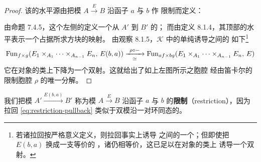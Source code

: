 \begin{proof}
该\trCartesian\trCell{}的水平源由把模 $A\xrightarrow{E}B$ 沿函子 $a$ 与 $b$ 作%
限制而定义：
\begin{rveq}\label{eq:restriction-pullback}
\end{rveq}
由命题 7.4.5，这个左侧的\trIsofibration{}定义一个从 $A'$ 到 $B'$ 的\trModule{}；%
而由定义 8.1.4，其顶部的水平\trFunctor{}表示一个占据所求方块的\trModule{}映射。%
由观察 8.1.5，$\mathcal{K}$ 中的单纯\trPullback{}诱导\trFunctorSpace{}之间的%
如下\trEquivalence\footnote{若诸拉回按严格意义定义，则拉回事实上诱导%
\trFunctorSpace{}之间的一个\trIsomorphism；但即使把 $E(b,a)$ 换成一支等价的%
\trModule，诸\trFunctorSpace{}仍相等价，这已足以在对象的\trIsomorphism{}类上%
诱导一个双射。}
\begin{equation*}
\operatorname{Fun}_{f\times g}(E_{1}\times_{A_{1}}\cdots\times_{A_{n-1}}E_{n},\,E(b,a))
\xrightarrow[\ \simeq\ ]{\ \rho\circ-\ }
\operatorname{Fun}_{af\times bg}(E_{1}\times_{A_{1}}\cdots\times_{A_{n-1}}E_{n},\,E)
\end{equation*}
它在对象的\trIsomorphism{}类上下降为一个双射。这就给出了如上左图所示之胞腔%
经由笛卡尔的限制胞腔 $\rho$ 的唯一分解。
\end{proof}

我们把模 $A'\xrightarrow{E(b,a)}B'$ 称为模 $A\xrightarrow{E}B$ 沿函子 $a$ 与
$b$ 的\textbf{限制}（restriction），因为拉回 \eqref{eq:restriction-pullback}%
类似于双模沿一对环同态的\trRestrictionOfScalars。

